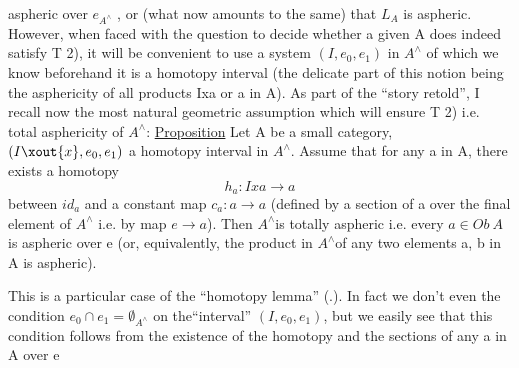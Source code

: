 
aspheric over $e_{A^\wedge}$ ,  or (what now amounts to the same) that $L_A$ is aspheric.
However,  when faced with the question to decide whether a given A does
indeed  satisfy  T 2),  it will be convenient to use a 
system  $(I,e_0,e_1)$ in $A^\wedge$ of which we know beforehand it is a homotopy
interval (the delicate part of this notion being the asphericity of all
products Ixa or a in A).   As part of the ``story retold'',  I recall
now the most natural geometric assumption which will ensure T 2)  i.e.
total  asphericity of $A^\wedge$:
\uline{Proposition}   Let A be a small category,  $(I\xout{x},e_0,e_1)$ a homotopy interval
in $A^\wedge$.  Assume that for any a in A,  there exists a homotopy
\[ h_a : Ixa \longrightarrow a \]
between  $id_a$ and a constant map  $c_a : a \longrightarrow a$  (defined by a section of a
over the final element of $A^\wedge$ i.e. by   map $e \longrightarrow a$).  Then $A^\wedge$is
totally aspheric i.e. every $a \in Ob\ A$ is aspheric over e  (or,  equivalently,
the product in $A^\wedge$\hand{/}of any two elements a, b in A is aspheric).

This is a particular case of the ``homotopy lemma'' (\unsure{\S}.).  In fact
we don't even the condition  $e_0 \cap e_1 = \emptyset_{A^\wedge}$  on the``interval'' $(I,e_0,e_1)$,
but we easily see that this condition follows from the existence of the
homotopy and the sections of any a in A over e\hand{,} 

